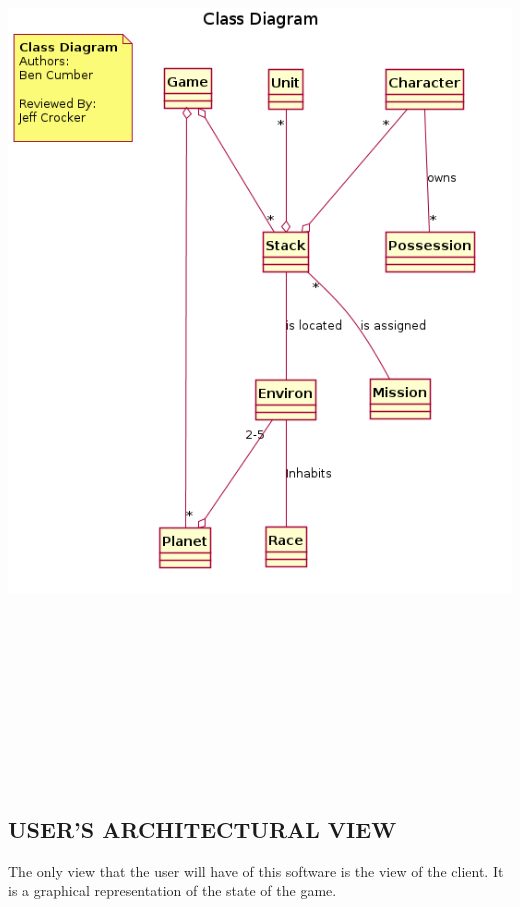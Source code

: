 \documentclass[twoside,letterpaper]{article}
\begin{document}
\includegraphics[width=6in,height=10in]{class_overview.png}
\newpage

\subsection[USER{\textquoteright}S ARCHITECTURAL
VIEW]{\bfseries\color{black}
USER{\textquoteright}S ARCHITECTURAL VIEW}
The only view that the user will have of this software is the view of the client. It is a graphical representation of the state of the game.
\end{document}
